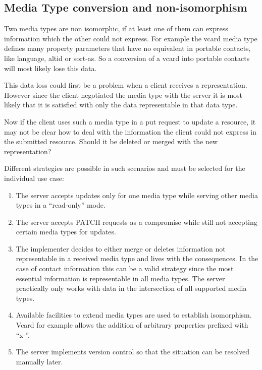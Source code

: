 \documentclass[12pt,a4paper,twoside]{scrartcl}		%
\begin{document}

\subsection{Media Type conversion and non-isomorphism}

Two media types are non isomorphic, if at least one of them can express
information which the other could not express. For example the vcard media type
defines many property parameters that have no equivalent in portable contacts,
like language, altid or sort-as. So a conversion of a vcard into portable
contacts will most likely lose this data.

This data loss could first be a problem when a client receives a
representation. However since the client negotiated the media type with the
server it is most likely that it is satisfied with only the data representable
in that data type.

Now if the client uses such a media type in a put request to update a resource,
it may not be clear how to deal with the information the client could not
express in the submitted resource. Should it be deleted or merged with the new
representation?

Different strategies are possible in such scenarios and must be selected for the
individual use case:

\begin{enumerate}
\item The server accepts updates only for one media type while serving other
  media types in a ``read-only'' mode.
\item The server accepts PATCH requests\cite{RFC5789} as a compromise while
  still not accepting certain media types for updates.
\item The implementer decides to either merge or deletes information not
  representable in a received media type and lives with the consequences. In the
  case of contact information this can be a valid strategy since the most
  essential information is representable in all media types. The server
  practically only works with data in the intersection of all supported media
  types.
\item Available facilities to extend media types are used to establish
  isomorphism. Vcard for example allows the addition of arbitrary properties
  prefixed with ``x-''.
\item The server implements version control so that the situation can be
  resolved manually later.
\end{enumerate}
\end{document}

